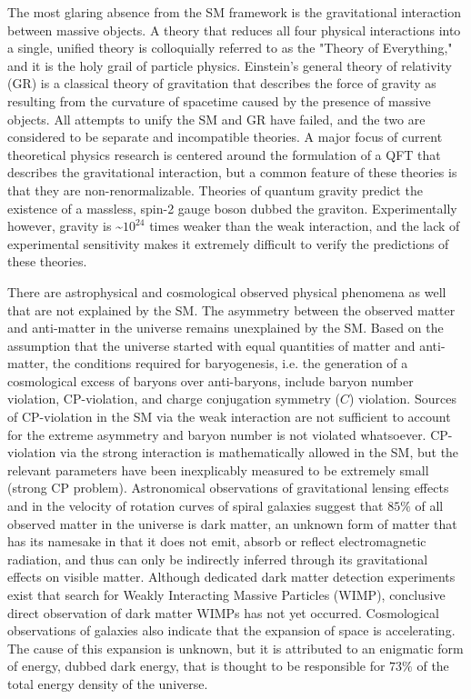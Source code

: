 The most glaring absence from the SM framework is the gravitational interaction between massive objects.
A theory that reduces all four physical interactions into a single, unified theory is colloquially referred to as the "Theory of Everything," and it is the holy grail of particle physics.
Einstein's general theory of relativity (GR) is a classical theory of gravitation that describes the force of gravity as resulting from the curvature of spacetime caused by the presence of massive objects.
All attempts to unify the SM and GR have failed, and the two are considered to be separate and incompatible theories.
A major focus of current theoretical physics research is centered around the formulation of a QFT that describes the gravitational interaction, but a common feature of these theories is that they are non-renormalizable.
Theories of quantum gravity predict the existence of a massless, spin-2 gauge boson dubbed the graviton.
Experimentally however, gravity is \sim$10^{24}$ times weaker than the weak interaction, and the lack of experimental sensitivity makes it extremely difficult to verify the predictions of these theories.

There are astrophysical and cosmological observed physical phenomena as well that are not explained by the SM.
The asymmetry between the observed matter and anti-matter in the universe remains unexplained by the SM.
Based on the assumption that the universe started with equal quantities of matter and anti-matter, the conditions required for baryogenesis, i.e. the generation of a cosmological excess of baryons over anti-baryons, include baryon number violation, CP-violation, and charge conjugation symmetry ($C$) violation.
Sources of CP-violation in the SM via the weak interaction are not sufficient to account for the extreme asymmetry and baryon number is not violated whatsoever.
CP-violation via the strong interaction is mathematically allowed in the SM, but the relevant parameters have been inexplicably measured to be extremely small (strong CP problem).
Astronomical observations of gravitational lensing effects and in the velocity of rotation curves of spiral galaxies suggest that $85 \%$ of all observed matter in the universe is dark matter, an unknown form of matter that has its namesake in that it does not emit, absorb or reflect electromagnetic radiation, and thus can only be indirectly inferred through its gravitational effects on visible matter.
Although dedicated dark matter detection experiments exist that search for Weakly Interacting Massive Particles (WIMP), conclusive direct observation of dark matter WIMPs has not yet occurred.
Cosmological observations of galaxies also indicate that the expansion of space is accelerating.
The cause of this expansion is unknown, but it is attributed to an enigmatic form of energy, dubbed dark energy, that is thought to be responsible for $73 \%$ of the total energy density of the universe.

